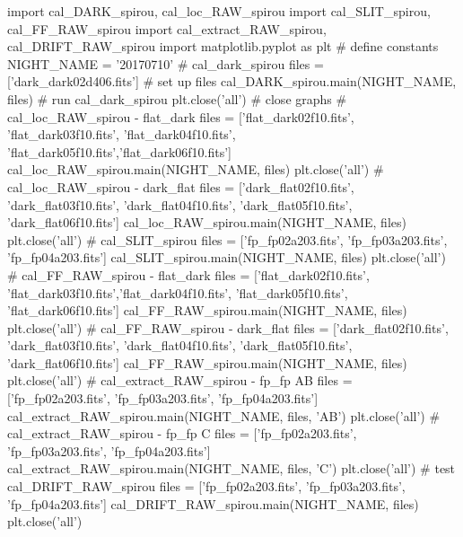 \begin{pythonbox}
import cal_DARK_spirou, cal_loc_RAW_spirou
import cal_SLIT_spirou, cal_FF_RAW_spirou
import cal_extract_RAW_spirou, cal_DRIFT_RAW_spirou
import matplotlib.pyplot as plt
# define constants
NIGHT_NAME = '20170710'
# cal_dark_spirou
files = ['dark_dark02d406.fits']          # set up files
cal_DARK_spirou.main(NIGHT_NAME, files)   # run cal_dark_spirou
plt.close('all')                          # close graphs
# cal_loc_RAW_spirou - flat_dark
files = ['flat_dark02f10.fits', 'flat_dark03f10.fits', 'flat_dark04f10.fits',
         'flat_dark05f10.fits','flat_dark06f10.fits']
cal_loc_RAW_spirou.main(NIGHT_NAME, files)
plt.close('all')
# cal_loc_RAW_spirou - dark_flat
files = ['dark_flat02f10.fits', 'dark_flat03f10.fits', 'dark_flat04f10.fits', 
         'dark_flat05f10.fits', 'dark_flat06f10.fits']
cal_loc_RAW_spirou.main(NIGHT_NAME, files)
plt.close('all')
# cal_SLIT_spirou
files = ['fp_fp02a203.fits', 'fp_fp03a203.fits', 'fp_fp04a203.fits']
cal_SLIT_spirou.main(NIGHT_NAME, files)
plt.close('all')
# cal_FF_RAW_spirou - flat_dark
files = ['flat_dark02f10.fits', 'flat_dark03f10.fits','flat_dark04f10.fits',
         'flat_dark05f10.fits', 'flat_dark06f10.fits']
cal_FF_RAW_spirou.main(NIGHT_NAME, files)
plt.close('all')
# cal_FF_RAW_spirou - dark_flat
files = ['dark_flat02f10.fits', 'dark_flat03f10.fits', 'dark_flat04f10.fits', 
         'dark_flat05f10.fits', 'dark_flat06f10.fits']
cal_FF_RAW_spirou.main(NIGHT_NAME, files)
plt.close('all')
# cal_extract_RAW_spirou - fp_fp AB
files = ['fp_fp02a203.fits', 'fp_fp03a203.fits', 'fp_fp04a203.fits']
cal_extract_RAW_spirou.main(NIGHT_NAME, files, 'AB')
plt.close('all')
# cal_extract_RAW_spirou - fp_fp C
files = ['fp_fp02a203.fits', 'fp_fp03a203.fits', 'fp_fp04a203.fits']
cal_extract_RAW_spirou.main(NIGHT_NAME, files, 'C')
plt.close('all')
# test cal_DRIFT_RAW_spirou
files = ['fp_fp02a203.fits', 'fp_fp03a203.fits', 'fp_fp04a203.fits']
cal_DRIFT_RAW_spirou.main(NIGHT_NAME, files)
plt.close('all')

\end{pythonbox}
